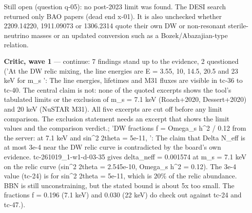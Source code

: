 \documentclass[11pt,a4paper]{article}
\begin{document}
Still open (question q-05): no post-2023 limit was found. The DESI search returned only BAO papers (dead end x-01). It is also unchecked whether 2209.14220, 1911.09073 or 1306.2314 quote their own DW or non-resonant sterile-neutrino masses or an updated conversion such as a Bozek/Abazajian-type relation.

\textbf{Critic, wave 1} --- continue: 7 findings stand up to the evidence, 2 questioned ('At the DW relic mixing, the line energies are E = 3.55, 10, 14.5, 20.5 and 23 keV for m\_s ': The line energies, lifetimes and M31 fluxes are visible in tc-36 to tc-40. The central claim is not: none of the quoted excerpts shows the tool's tabulated limits or the exclusion of m\_s = 7.1 keV (Roach+2020, Dessert+2020) and 20 keV (NuSTAR M31). All five excerpts are cut off before any limit comparison. The exclusion statement needs an excerpt that shows the limit values and the comparison verdict.; 'DW fractions f = Omega\_s h\textasciicircum{}2 / 0.12 from the server: at 7.1 keV and sin\textasciicircum{}2 2theta = 5e-11, ': The claim that Delta N\_eff is at most 3e-4 near the DW relic curve is contradicted by the board's own evidence. tc-261019\_1-w1-d-03-35 gives delta\_neff = 0.001574 at m\_s = 7.1 keV on the relic curve (sin\textasciicircum{}2 2theta = 2.545e-10, Omega\_s h\textasciicircum{}2 = 0.12). The 3e-4 value (tc-24) is for sin\textasciicircum{}2 2theta = 5e-11, which is 20\% of the relic abundance. BBN is still unconstraining, but the stated bound is about 5x too small. The fractions f = 0.196 (7.1 keV) and 0.030 (22 keV) do check out against tc-24 and tc-47.).
\end{document}
